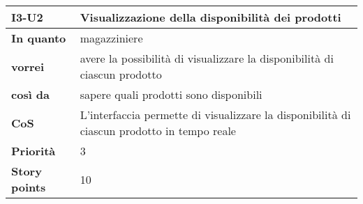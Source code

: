\begin{table}[H]
  \begin{tabularx}{\textwidth}{lX}
    \toprule
    \textbf{I3-U2} & \textbf{Visualizzazione della disponibilità dei prodotti} \\
    \midrule
    \textbf{In quanto} & magazziniere \\
    \textbf{vorrei} & avere la possibilità di visualizzare la disponibilità di ciascun prodotto \\
    \textbf{così da} & sapere quali prodotti sono disponibili \\
    \midrule
    \textbf{CoS} & L'interfaccia permette di visualizzare la disponibilità di ciascun prodotto in tempo reale \\
    \midrule
    \textbf{Priorità} & 3 \\
    \textbf{Story points} & 10 \\
    \bottomrule
  \end{tabularx}
  \label{user-story:i3-u2}
\end{table}
